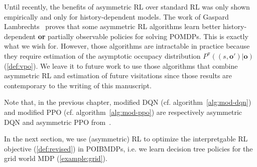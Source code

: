 Until recently, the benefits of asymmetric RL over standard RL was only shown empirically and only for history-dependent models.
The work of Gaspard Lambrechts~\cite{justif-asym} proves that some asymmetric RL algorithms learn better history-dependent \textbf{or} partially observable policies for solving POMDPs.
This is exactly what we wish for. However, those algorithms are intractable in practice because they require estimation of the asymptotic occupacy distribution $P^{\pi}((s, \boldsymbol{o}')|\boldsymbol{o})$ (\ref{def:vpo}).
We leave it to future work to use those algorithms that combine asymmetric RL and estimation of future visitations since those results are contemporary to the writing of this manuscript.

Note that, in the previous chapter, modified DQN (cf. algorithm~\ref{alg:mod-dqn}) and modified PPO (cf. algorithm~\ref{alg:mod-ppo}) are respectively asymmetric DQN and asymmetric PPO from~\cite{baisero-dqn,baisero-ppo}.

In the next section, we use (asymmetric) RL to optimize the interpretgable RL objective (\ref{def:revised}) in POIBMDPs, i.e. we learn decision tree policies for the grid world MDP (\ref{example:grid}).

